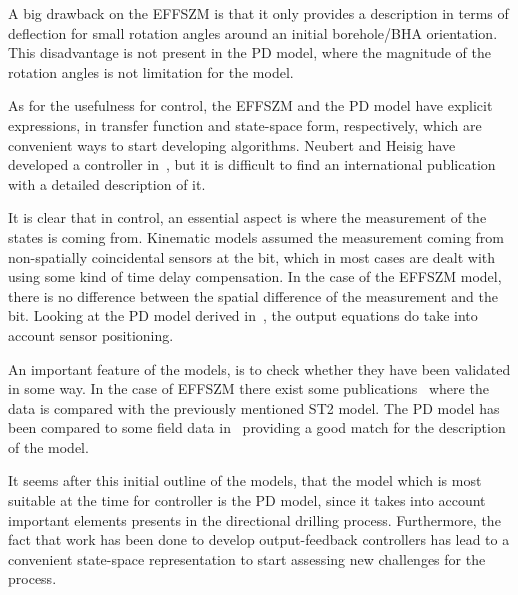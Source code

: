 A big drawback on the EFFSZM is that it only provides a description in terms of deflection for small rotation angles around an initial borehole/BHA orientation. This disadvantage is not present in the PD model, where the magnitude of the rotation angles is not limitation for the model.

As for the usefulness for control, the EFFSZM and the PD model have explicit expressions, in transfer function and state-space form, respectively, which are convenient ways to start developing algorithms. Neubert and Heisig have developed a controller in~\cite{Neub97}, but it is difficult to find an international publication with a detailed description of it.

It is clear that in control, an essential aspect is where the measurement of the states is coming from. Kinematic models assumed the measurement coming from non-spatially coincidental sensors at the bit, which in most cases are dealt with using some kind of time delay compensation. In the case of the EFFSZM model, there is no difference between the spatial difference of the measurement and the bit. Looking at the PD model derived in~\cite{Monsieurs2015}, the output equations do take into account sensor positioning.

An important feature of the models, is to check whether they have been validated in some way. In the case of EFFSZM there exist some publications~\cite{Down07} where the data is compared with the previously mentioned ST2 model. The PD model has been compared to some field data in~\cite{Marck2015} providing a good match for the description of the model. 

It seems after this initial outline of the models, that the model which is most suitable at the time for controller is the PD model, since it takes into account important elements presents in the directional drilling process. Furthermore, the fact that work has been done to develop output-feedback controllers has lead to a convenient state-space representation to start assessing new challenges for the process.



